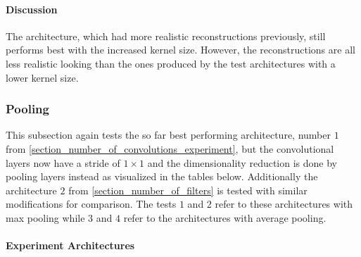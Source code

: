 \paragraph{Discussion}


The architecture, which had more realistic reconstructions previously, still performs best with the increased
kernel size. However, the reconstructions are all less realistic looking than the ones produced by the 
test architectures with a lower kernel size.

\subsubsection{Pooling}

This subsection again tests the so far best performing architecture, number $1$ from  
\autoref{section_number_of_convolutions_experiment}, but the convolutional layers now have a stride of $1\times1$
and the dimensionality reduction is done by pooling layers instead as visualized in the tables below. 
Additionally the architecture $2$ from \autoref{section_number_of_filters} is tested 
with similar modifications for comparison. The tests $1$ and $2$ refer to these architectures with max pooling
while $3$ and $4$ refer to the architectures with average pooling.


\paragraph{Experiment Architectures}

